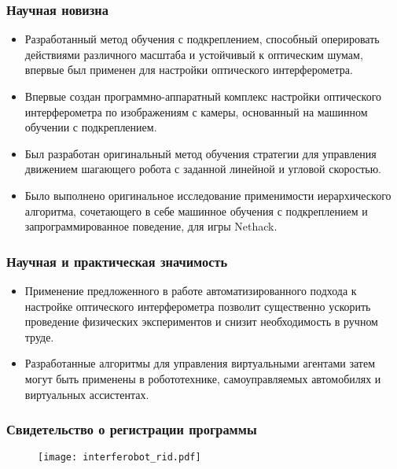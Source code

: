 \begin{frame}
    \frametitle{Научная новизна}
    \begin{itemize}
        \item Разработанный метод обучения с подкреплением, способный оперировать действиями различного масштаба и устойчивый к оптическим шумам, впервые был применен для настройки оптического интерферометра.
        \item Впервые создан программно-аппаратный комплекс настройки оптического интерферометра по изображениям с камеры, основанный на машинном обучении с подкреплением.
        \item Был разработан оригинальный метод обучения стратегии для управления движением шагающего робота с заданной линейной и угловой скоростью.
        \item Было выполнено оригинальное исследование применимости иерархического алгоритма, сочетающего в себе машинное обучения с подкреплением и запрограммированное поведение, для игры Nethack.
    \end{itemize}
\end{frame}

\begin{frame}
    \frametitle{Научная и практическая значимость}
    \begin{itemize}
        \item Применение предложенного в работе автоматизированного подхода к настройке оптического интерферометра позволит существенно ускорить проведение физических экспериментов и снизит необходимость в ручном труде.
        \item Разработанные алгоритмы для управления виртуальными агентами затем могут быть применены в робототехнике, самоуправляемых автомобилях и виртуальных ассистентах.
    \end{itemize}
\end{frame}

\begin{frame}
    \frametitle{Свидетельство о регистрации программы}
    \begin{figure}[h]
        \centering
        \texttt{[image: interferobot\_rid.pdf]}
    \end{figure}
\end{frame}

